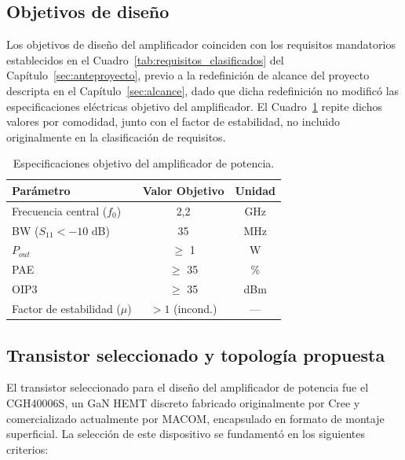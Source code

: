 \subsection{Objetivos de diseño}
Los objetivos de diseño del amplificador coinciden con los requisitos mandatorios establecidos en el Cuadro~\ref{tab:requisitos_clasificados} del Capítulo~\ref{sec:anteproyecto}, previo a la redefinición de alcance del proyecto descripta en el Capítulo~\ref{sec:alcance}, dado que dicha redefinición no modificó las especificaciones eléctricas objetivo del amplificador. El Cuadro~\ref{tab:objetivos_diseno} repite dichos valores por comodidad, junto con el factor de estabilidad, no incluido originalmente en la clasificación de requisitos.

\begin{table}[H]
    \centering
    \caption{Especificaciones objetivo del amplificador de potencia.}
    \label{tab:objetivos_diseno}
    \begin{tabular}{lcc}
        \hline\hline
        \textbf{Parámetro}                   & \textbf{Valor Objetivo} & \textbf{Unidad} \\
        \hline
        Frecuencia central ($f_0$)           & 2,2                     & GHz             \\
        BW ($S_{11} < -10$ dB)               & 35                      & MHz             \\
        $P_{out}$                            & $\ge$ 1                 & W               \\
        PAE                                  & $\ge$ 35                & \%              \\
        OIP3                                 & $\ge$ 35                & dBm             \\
        Factor de estabilidad ($\mu$)        & $> 1$ (incond.)         & ---             \\
        \hline\hline
    \end{tabular}
\end{table}

\subsection{Transistor seleccionado y topología propuesta}
El transistor seleccionado para el diseño del amplificador de potencia fue el CGH40006S, un GaN HEMT discreto fabricado originalmente por Cree y comercializado actualmente por MACOM, encapsulado en formato de montaje superficial. La selección de este dispositivo se fundamentó en los siguientes criterios:

